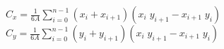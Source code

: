 $C_x=\frac{1}{6A}\sum_{i=0}^{n-1}(x_i+x_{i+1})(x_i\;y_{i+1}-x_{i+1}\;y_i)$ \newline
$C_y=\frac{1}{6A}\sum_{i=0}^{n-1}(y_i+y_{i+1})(x_i\;y_{i+1}-x_{i+1}\;y_i)$

